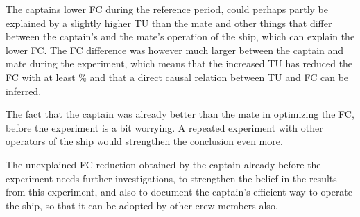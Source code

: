 The captains lower FC during the reference period, could perhaps partly be explained by a slightly higher TU than the mate and other things that differ between the captain's and the mate's operation of the ship, which can explain the lower FC. The FC difference was however much larger between the captain and mate during the experiment, which means that the increased TU has reduced the FC with at least \savingthrusterallocationpct \% and that a direct causal relation between TU and FC can be inferred.

The fact that the captain was already better than the mate in optimizing the FC, before the experiment is a bit worrying. A repeated experiment with other operators of the ship would strengthen the conclusion even more.

The unexplained FC reduction obtained by the captain already before the experiment needs further investigations, to strengthen the belief in the results from this experiment, and also to document the captain's efficient way to operate the ship, so that it can be adopted by other crew members also. 